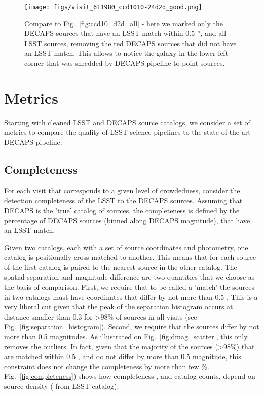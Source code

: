 \documentclass[DM,lsstdraft,toc,usenatbib]{lsstdoc}
\begin{document}
\begin{figure}
\begin{centering}
\texttt{[image: figs/visit\_611980\_ccd1010-24d2d\_good.png]}
\caption{Compare to Fig.~\ref{fig:ccd10_d2d_all} - here we marked only the DECAPS sources that have an LSST match within 0.5 '', and all LSST sources, removing the red DECAPS sources that did not have an LSST match. This allows to notice the galaxy in the lower left corner that was shredded by DECAPS pipeline to point sources.  }
\label{fig:ccd10_d2d_plain}
\end{centering}
\end{figure} 

\section{Metrics}
\label{sec:metrics}

Starting with cleaned LSST and DECAPS source catalogs, we consider a set of metrics to compare the quality of LSST science pipelines to the  state-of-the-art DECAPS pipeline.  

\subsection{Completeness}

For each visit that corresponds to a given level of crowdedness, consider the detection completeness of the LSST to the DECAPS sources. Assuming that DECAPS is the 'true' catalog of sources, the completeness is defined by the percentage of DECAPS sources (binned along DECAPS magnitude), that have an LSST match. 

Given two catalogs, each with a set of  source coordinates and photometry,  one catalog is positionally cross-matched to another.  This means that for each source of the first catalog is paired to the nearest source in the other catalog. The spatial separation and magnitude difference are two quantities that we choose  as the basis of comparison.  First, we require that to be called a 'match' the sources in two catalogs must have coordinates that differ by not more than 0.5 \arcsec. This is a very liberal cut given that the peak of the separation histogram occurs at distance smaller than 0.3 \arcsec for >98\% of sources in all visits (see Fig.~\ref{fig:separation_histogram}).  Second,  we require that the sources differ by not more than 0.5 magnitudes. As illustrated on Fig.~\ref{fig:dmag_scatter}, this only removes the outliers.  In fact, given that the majority of the sources (>98\%) that are matched within 0.5 \arcsec, and do not differ by more than 0.5 magnitude, this constraint does not change the completeness by more than few \%.   Fig.~\ref{fig:completeness}) shows how completeness , and catalog counts, depend on source density ( from LSST catalog).  
\end{document}
